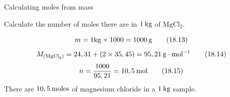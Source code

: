     \noindent
  \vspace{-.3cm}
\par
            \label{m38717*secfhsst!!!underscore!!!id641}\vspace{.5cm}  
      \begin{wex}{Calculating moles from mass }
{
      \label{m38717*id278755}Calculate the number of moles there are in $1\phantom{\rule{2pt}{0ex}}\mathrm{kg}$ of $\mathrm{MgCl}{}_{2}$.\par 
      \vspace{5pt}}
{


\label{m38717*id278854}\nopagebreak\noindent{}
    \begin{equation}
    m=1\mathrm{kg}\ensuremath{\times}1 000=1 000\phantom{\rule{2pt}{0ex}}\mathrm{g}\tag{18.13}
      \end{equation}
\label{m38717*id278912}\nopagebreak\noindent{}
    \begin{equation}
    {M}_{\left({\mathrm{MgCl}}_{2}\right)}=24,31+\left(2\ensuremath{\times}35,45\right)=95,21\phantom{\rule{2pt}{0ex}}\mathrm{g}\ensuremath{\cdot}{\mathrm{mol}}^{-1}\tag{18.14}
      \end{equation}    
      \label{m38717*id279005}\nopagebreak\noindent{}
    \begin{equation}
    n=\frac{1000}{95,21}=10,5\phantom{\rule{2pt}{0ex}}\mathrm{mol}\tag{18.15}
      \end{equation}
      \label{m38717*id279046}There are $10,5\phantom{\rule{2pt}{0ex}}\mathrm{moles}$ of magnesium chloride in a $1\phantom{\rule{2pt}{0ex}}\mathrm{kg}$ sample.\par 
}
    \end{wex}
    \noindent
\label{m38717*secfhsst!!!underscore!!!id695}\vspace{.5cm} 
